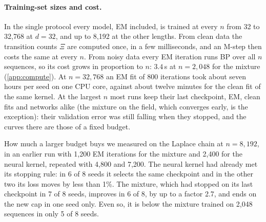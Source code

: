 \documentclass{article}
\begin{document}
\paragraph{Training-set sizes and cost.} In the single protocol every model, EM included, is trained at every $n$ from
32 to 32{,}768 at $d=32$, and up to 8{,}192 at the other lengths. From clean data the transition counts $\Xi$ are
computed once, in a few milliseconds, and an M-step then costs the same at every $n$. From noisy data every EM iteration
runs BP over all $n$ sequences, so its cost grows in proportion to $n$: $3.4$\,s at $n=2{,}048$ for the mixture
(\cref{app:compute}). At $n=32{,}768$ an EM fit of 800 iterations took about seven hours per seed on one CPU core,
against about twelve minutes for the clean fit of the same kernel. At the largest $n$ most runs keep their last
checkpoint, EM, clean fits and networks alike (the mixture on the field, which converges early, is the exception): their
validation error was still falling when they stopped, and the curves there are those of a fixed budget.

How much a larger budget buys we measured on the Laplace chain at $n=8{,}192$, in an earlier run with 1{,}200 EM
iterations for the mixture and 2{,}400 for the neural kernel, repeated with 4{,}800 and 7{,}200. The neural kernel had
already met its stopping rule: in 6 of 8 seeds it selects the same checkpoint and in the other two its loss moves by
less than 1\%. The mixture, which had stopped on its last checkpoint in 7 of 8 seeds, improves in 6 of 8, by up to a
factor 2.7, and ends on the new cap in one seed only. Even so, it is below the mixture trained on 2{,}048 sequences in
only 5 of 8 seeds.
\end{document}
